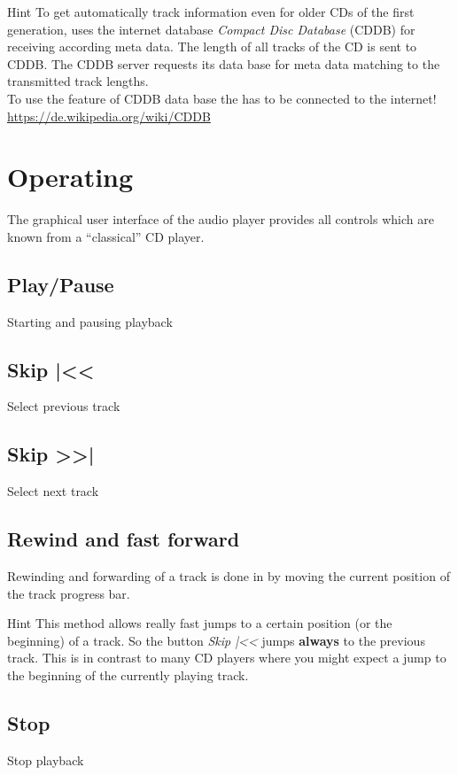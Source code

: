 \begin{bclogo}[logo = \bclampe, noborder = true]{Hint}
To get automatically track information even for older CDs of the first 
generation, {\audacious} uses the internet database \textit{Compact Disc
Database} (CDDB) for receiving according meta data. The length of all
tracks of the CD is sent to CDDB. The CDDB server requests its data base
for meta data matching to the transmitted track lengths.\\
To use the feature of CDDB data base the {\Bezeichnung} has to be 
connected to the internet!\\
\url{https://de.wikipedia.org/wiki/CDDB}
\end{bclogo}


\section{Operating}
The graphical user interface of the audio player {\audacious} provides
all controls which are known from a ``classical'' CD player.
\subsection*{Play/Pause}
Starting and pausing playback
\subsection*{Skip |<<}
Select previous track
\subsection*{Skip >>|}
Select next track
\subsection*{Rewind and fast forward}
Rewinding and forwarding of a track is done in  {\audacious} by moving
the current position of the track progress bar.
\begin{bclogo}[logo = \bclampe, noborder = true]{Hint} 
This method allows really fast jumps to a certain position (or the 
beginning) of a track. So the button \textit{Skip |<<} jumps 
\textbf{always} to the previous track. This is in contrast to many CD 
players where you might expect a jump to the beginning of the currently 
playing track.
\end{bclogo}
\subsection*{Stop}
Stop playback
